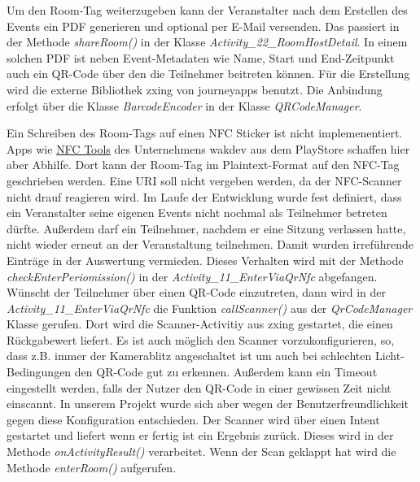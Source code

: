 Um den Room-Tag weiterzugeben kann der Veranstalter nach dem Erstellen des Events ein PDF generieren und optional per E-Mail versenden. 
Das passiert in der Methode \textit{shareRoom()} in der Klasse \textit{Activity\_22\_RoomHostDetail}. 
In einem solchen PDF ist neben Event-Metadaten wie Name, Start und End-Zeitpunkt auch ein QR-Code über den die Teilnehmer beitreten können. 
Für die Erstellung wird die externe Bibliothek zxing von journeyapps benutzt. Die Anbindung erfolgt über die Klasse \textit{BarcodeEncoder} in der Klasse \textit{QRCodeManager}.

Ein Schreiben des Room-Tags auf einen NFC Sticker ist nicht implemenentiert.
 Apps wie \href{https://play.google.com/store/apps/details?id=com.wakdev.wdnfc&hl=de&gl=US}{NFC Tools} des Unternehmens wakdev aus dem PlayStore schaffen hier aber Abhilfe. 
Dort kann der Room-Tag im Plaintext-Format auf den NFC-Tag geschrieben werden.
Eine URI soll nicht vergeben werden, da der NFC-Scanner nicht drauf reagieren wird.
Im Laufe der Entwicklung  wurde fest definiert, dass ein Veranstalter seine eigenen Events nicht nochmal als Teilnehmer betreten dürfte.
Außerdem darf ein Teilnehmer, nachdem er eine Sitzung verlassen hatte, nicht wieder erneut an der Veranstaltung teilnehmen.
Damit wurden irreführende Einträge in der Auswertung vermieden. Dieses Verhalten wird mit der Methode \textit{checkEnterPeriomission()} in der \textit{Activity\_11\_EnterViaQrNfc} abgefangen.
\\ 
Wünscht der Teilnehmer über einen QR-Code einzutreten, dann wird in der \textit{Activity\_11\_EnterViaQrNfc} die Funktion \textit{callScanner()} aus der \textit{QrCodeManager} Klasse gerufen. 
Dort wird die Scanner-Activitiy aus zxing gestartet, die einen Rückgabewert liefert. 
Es ist auch möglich den Scanner vorzukonfigurieren, so, dass z.B. immer der Kamerablitz angeschaltet ist um auch bei schlechten Licht-Bedingungen den QR-Code gut zu erkennen. 
Außerdem kann ein Timeout eingestellt werden, falls der Nutzer den QR-Code in einer gewissen Zeit nicht einscannt.
In unserem Projekt wurde sich aber wegen der Benutzerfreundlichkeit gegen diese Konfiguration entschieden.
Der Scanner wird über einen Intent gestartet und liefert wenn er fertig ist ein Ergebnis zurück.
Dieses wird in der Methode \textit{onActivityResult()} verarbeitet. Wenn der Scan geklappt hat wird die Methode \textit{enterRoom()} aufgerufen. 
